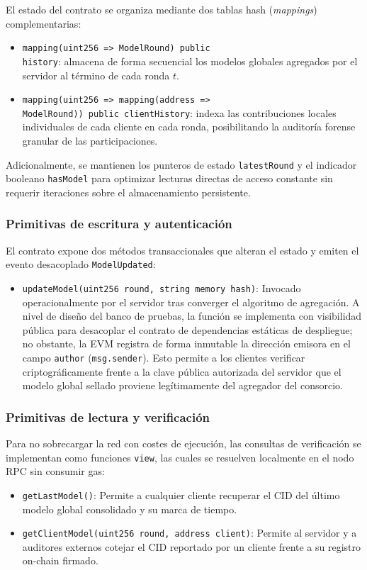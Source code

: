 El estado del contrato se organiza mediante dos tablas hash (\textit{mappings}) complementarias:
\begin{itemize}
    \item \texttt{mapping(uint256 => ModelRound) public \\ history}: almacena de forma secuencial los modelos globales agregados por el servidor al término de cada ronda $t$.
    \item \texttt{mapping(uint256 => mapping(address => \\ ModelRound)) public clientHistory}: indexa las contribuciones locales individuales de cada cliente en cada ronda, posibilitando la auditoría forense granular de las participaciones.
\end{itemize}

Adicionalmente, se mantienen los punteros de estado \texttt{latestRound} y el indicador booleano \texttt{hasModel} para optimizar lecturas directas de acceso constante sin requerir iteraciones sobre el almacenamiento persistente.
\\

\subsubsection{Primitivas de escritura y autenticación}
El contrato expone dos métodos transaccionales que alteran el estado y emiten el evento desacoplado \texttt{ModelUpdated}:
\begin{itemize}
    \item \texttt{updateModel(uint256 round, string memory hash)}: Invocado operacionalmente por el servidor tras converger el algoritmo de agregación. A nivel de diseño del banco de pruebas, la función se implementa con visibilidad pública para desacoplar el contrato de dependencias estáticas de despliegue; no obstante, la EVM registra de forma inmutable la dirección emisora en el campo \texttt{author} (\texttt{msg.sender}). Esto permite a los clientes verificar criptográficamente frente a la clave pública autorizada del servidor que el modelo global sellado proviene legítimamente del agregador del consorcio.
\end{itemize}

\subsubsection{Primitivas de lectura y verificación}
Para no sobrecargar la red con costes de ejecución, las consultas de verificación se implementan como funciones \texttt{view}, las cuales se resuelven localmente en el nodo RPC sin consumir gas:
\begin{itemize}
    \item \texttt{getLastModel()}: Permite a cualquier cliente recuperar el CID del último modelo global consolidado y su marca de tiempo.
    \item \texttt{getClientModel(uint256 round, address client)}: Permite al servidor y a auditores externos cotejar el CID reportado por un cliente frente a su registro on-chain firmado.
\end{itemize}


